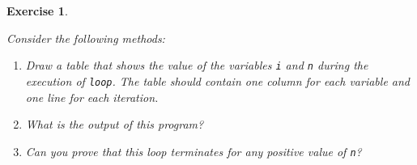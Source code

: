 \documentclass[12pt]{book}
\theoremstyle{exercise}
\newtheorem{exercise}{Exercise}[chapter]
\newcommand{\java}[1]{\verb"#1"}
\newcommand{\java}[1]{\lstinline{#1}} %
\begin{document}
\begin{exercise}
\label{infloop}

Consider the following methods:


\begin{enumerate}

\item Draw a table that shows the value of the variables \java{i} and \java{n} during the execution of \java{loop}.
The table should contain one column for each variable and one line for each iteration.

\item What is the output of this program?

\item Can you prove that this loop terminates for any positive value of \java{n}?



\end{enumerate}

\end{exercise}
\end{document}
